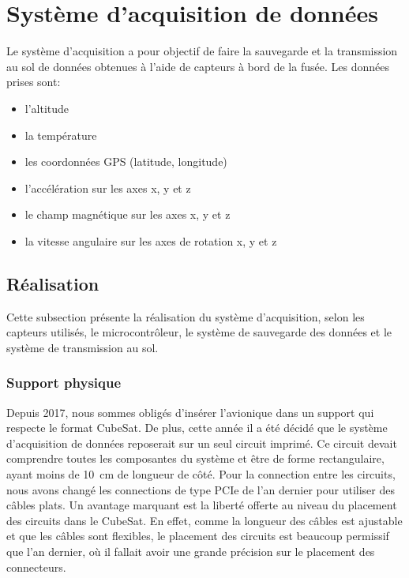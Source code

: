 \section{Système d'acquisition de données}
\label{chap:acquisition}

Le système d'acquisition a pour objectif de faire la sauvegarde et la
transmission au sol de données obtenues à l'aide de capteurs à bord de la fusée.
Les données prises sont:

\begin{itemize}
	\item l'altitude
	\item la température
	\item les coordonnées GPS (latitude, longitude)
	\item l'accélération sur les axes x, y et z
	\item le champ magnétique sur les axes x, y et z
	\item la vitesse angulaire sur les axes de rotation x, y et z
\end{itemize}


\subsection{Réalisation}

Cette subsection présente la réalisation du système d'acquisition, selon les
capteurs utilisés, le microcontrôleur, le système de sauvegarde des données et
le système de transmission au sol.

\subsubsection{Support physique}

Depuis 2017, nous sommes obligés d'insérer l'avionique dans un support qui
respecte le format CubeSat. De plus, cette année il a été décidé que le système
d'acquisition de données reposerait sur un seul circuit imprimé. Ce circuit
devait comprendre toutes les composantes du système et être de forme
rectangulaire, ayant moins de 10~cm de longueur de côté. Pour la connection
entre les circuits, nous avons changé les connections de type PCIe de l'an
dernier pour utiliser des câbles plats. Un avantage marquant est la liberté
offerte au niveau du placement des circuits dans le CubeSat. En effet, comme
la longueur des câbles est ajustable et que les câbles sont flexibles, le
placement des circuits est beaucoup permissif que l'an dernier, où il fallait
avoir une grande précision sur le placement des connecteurs.

